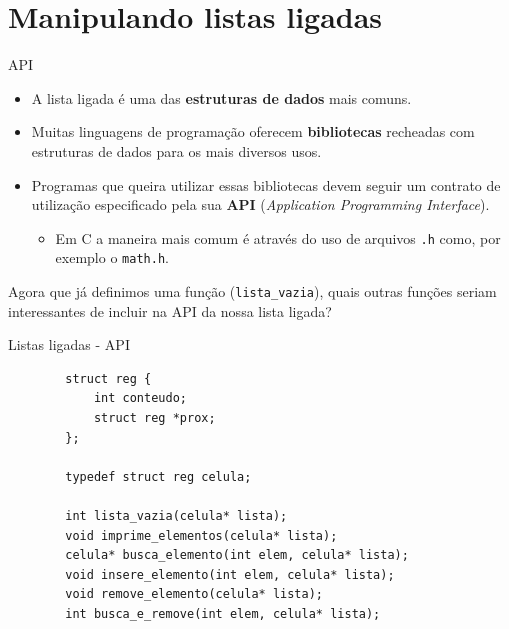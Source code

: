 \documentclass{beamer}
\newcommand{\cod}[1]{\texttt{#1}}
\newcommand{\textcolortwo}[2]{\textcolor{#1}{#2}}
\newcommand{\textblue}[1]{\textcolortwo{uiblue}{#1}}
\newcommand{\textbblue}[1]{\textbf{\textblue{#1}}}
\begin{document}
\section{Manipulando listas ligadas}

\begin{frame}[fragile]{API}

    \begin{itemize}
        \item A lista ligada é uma das \textbblue{estruturas de dados} mais comuns.
        \item Muitas linguagens de programação oferecem \textbblue{bibliotecas} recheadas com estruturas de dados para os mais diversos usos.
        \item Programas que queira utilizar essas bibliotecas devem seguir um contrato de utilização especificado pela sua \textbblue{API} (\emph{Application Programming Interface}).
        \begin{itemize}
            \item Em C a maneira mais comum é através do uso de arquivos \cod{.h} como, por exemplo o \cod{math.h}.
        \end{itemize}
    \end{itemize}

    Agora que já definimos uma função (\cod{lista_vazia}), quais outras funções seriam interessantes de incluir na API da nossa lista ligada?

\end{frame}

\begin{frame}[fragile]{Listas ligadas - API}

    \begin{verbatim}
        struct reg {
            int conteudo;
            struct reg *prox;
        };

        typedef struct reg celula;

        int lista_vazia(celula* lista);
        void imprime_elementos(celula* lista);
        celula* busca_elemento(int elem, celula* lista);
        void insere_elemento(int elem, celula* lista);
        void remove_elemento(celula* lista);
        int busca_e_remove(int elem, celula* lista);
    \end{verbatim}

\end{frame}
\end{document}
